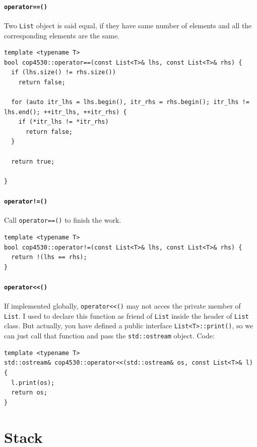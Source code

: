\documentclass[11pt]{book}
\begin{document}
\subsubsection{\texttt{operator==()}}
\label{sec:orge62c4a8}
Two \texttt{List} object is said equal, if they have same number of elements and all the corresponding elements are the same.
\begin{verbatim}
template <typename T>
bool cop4530::operator==(const List<T>& lhs, const List<T>& rhs) {
  if (lhs.size() != rhs.size())
    return false;

  for (auto itr_lhs = lhs.begin(), itr_rhs = rhs.begin(); itr_lhs != lhs.end(); ++itr_lhs, ++itr_rhs) {
    if (*itr_lhs != *itr_rhs)
      return false;
  }

  return true;

}
\end{verbatim}
\subsubsection{\texttt{operator!=()}}
\label{sec:orgc07734d}
Call \texttt{operator==()} to finish the work.
\begin{verbatim}
template <typename T>
bool cop4530::operator!=(const List<T>& lhs, const List<T>& rhs) {
  return !(lhs == rhs);
}
\end{verbatim}
\subsubsection{\texttt{operator<<()}}
\label{sec:org0c08b59}
If implemented globally, \texttt{operator<<()} may not acces the private member of \texttt{List}. I used to declare this function as friend of \texttt{List} inside the header of \texttt{List} class. But actually, you have defined a public interface \texttt{List<T>::print()}, so we can just call that function and pass the \texttt{std::ostream} object. Code:
\begin{verbatim}
template <typename T>
std::ostream& cop4530::operator<<(std::ostream& os, const List<T>& l) {
  l.print(os);
  return os;
}
\end{verbatim}
\chapter{Stack}
\label{sec:orge056c33}
\end{document}
